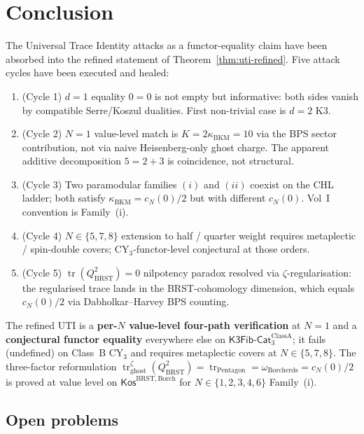 \documentclass[11pt]{article}
\theoremstyle{definition}
\newcommand{\kBKM}{\kappa_{\mathrm{BKM}}}
\newcommand{\BRST}{\mathrm{BRST}}
\newcommand{\tr}{\operatorname{tr}}
\begin{document}
\section{Conclusion}
\label{sec:conclusion}

The Universal Trace Identity attacks as a functor-equality claim have
been absorbed into the refined statement of
Theorem~\ref{thm:uti-refined}. Five attack cycles have been executed
and healed:

\begin{enumerate}[(C1)]
\item (Cycle 1) $d = 1$ equality $0 = 0$ is not empty but informative:
both sides vanish by compatible Serre/Koszul dualities. First non-trivial
case is $d = 2$ K3.

\item (Cycle 2) $N = 1$ value-level match is $K = 2 \kBKM = 10$ via the
BPS sector contribution, not via naive Heisenberg-only ghost charge.
The apparent additive decomposition $5 = 2 + 3$ is coincidence, not
structural.

\item (Cycle 3) Two paramodular families $(i)$ and $(ii)$ coexist on the
CHL ladder; both satisfy $\kBKM = c_N(0)/2$ but with different $c_N(0)$.
Vol~I convention is Family~(i).

\item (Cycle 4) $N \in \{5, 7, 8\}$ extension to half / quarter weight
requires metaplectic / spin-double covers; CY$_3$-functor-level
conjectural at those orders.

\item (Cycle 5) $\tr(Q_{\BRST}^2) = 0$ nilpotency paradox resolved via
$\zeta$-regularisation: the regularised trace lands in the BRST-cohomology
dimension, which equals $c_N(0)/2$ via Dabholkar--Harvey BPS counting.
\end{enumerate}

The refined UTI is a \textbf{per-$N$ value-level four-path
verification} at $N = 1$ and a \textbf{conjectural functor equality}
everywhere else on $\mathsf{K3Fib}\text{-}\mathsf{Cat}_3^{\mathrm{Class A}}$;
it fails (undefined) on Class~B CY$_3$ and requires metaplectic covers
at $N \in \{5, 7, 8\}$. The three-factor reformulation
$\tr^{\zeta}_{\mathrm{ghost}}(Q_{\BRST}^2) = \tr_{\mathrm{Pentagon}} =
\omega_{\mathrm{Borcherds}} = c_N(0)/2$ is proved at value level on
$\mathsf{Kos}^{\BRST,\mathrm{Borch}}$ for $N \in \{1, 2, 3, 4, 6\}$
Family~(i).

\subsection{Open problems}
\end{document}
